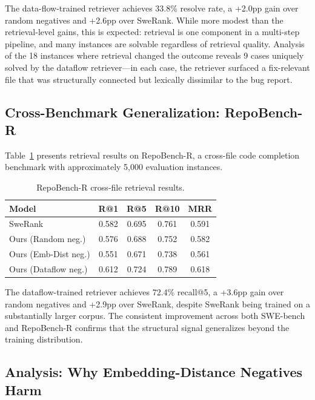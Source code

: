\documentclass[11pt]{article}
\begin{document}
The data-flow-trained retriever achieves 33.8\% resolve rate, a +2.0pp gain over random negatives and +2.6pp over SweRank.
While more modest than the retrieval-level gains, this is expected: retrieval is one component in a multi-step pipeline, and many instances are solvable regardless of retrieval quality.
Analysis of the 18 instances where retrieval changed the outcome reveals 9 cases uniquely solved by the dataflow retriever---in each case, the retriever surfaced a fix-relevant file that was structurally connected but lexically dissimilar to the bug report.

\subsection{Cross-Benchmark Generalization: RepoBench-R}

Table~\ref{tab:repobench} presents retrieval results on RepoBench-R, a cross-file code completion benchmark with approximately 5{,}000 evaluation instances.

\begin{table}[h]
\centering
\caption{RepoBench-R cross-file retrieval results.}
\label{tab:repobench}
\small
\begin{tabular}{lcccc}
\toprule
\textbf{Model} & \textbf{R@1} & \textbf{R@5} & \textbf{R@10} & \textbf{MRR} \\
\midrule
SweRank                  & 0.582 & 0.695 & 0.761 & 0.591 \\
Ours (Random neg.)       & 0.576 & 0.688 & 0.752 & 0.582 \\
Ours (Emb-Dist neg.)     & 0.551 & 0.671 & 0.738 & 0.561 \\
Ours (Dataflow neg.)     & 0.612 & 0.724 & 0.789 & 0.618 \\
\bottomrule
\end{tabular}
\end{table}

The dataflow-trained retriever achieves 72.4\% recall@5, a +3.6pp gain over random negatives and +2.9pp over SweRank, despite SweRank being trained on a substantially larger corpus.
The consistent improvement across both SWE-bench and RepoBench-R confirms that the structural signal generalizes beyond the training distribution.

\subsection{Analysis: Why Embedding-Distance Negatives Harm}
\end{document}
